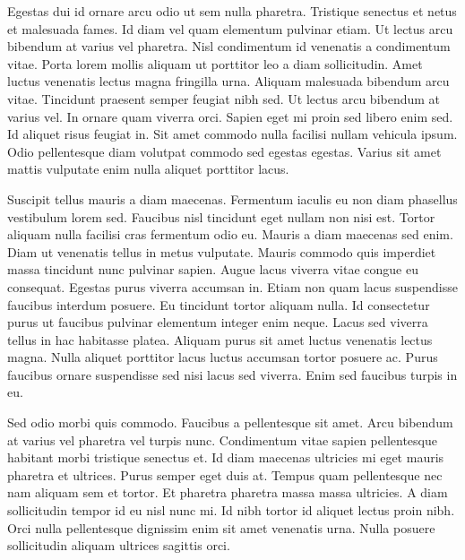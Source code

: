 \documentclass[paper = a4, fontsize = 12pt, numbers = noenddot, DIV = 15, twoside, 
paper = portrait,
listof = totoc,
listof = chapterentry,
egregdoesnotlikesansseriftitles, %
parskip = half %
]{scrbook}
\begin{document}
Egestas dui id ornare arcu odio ut sem nulla pharetra. Tristique senectus et netus et malesuada fames. Id diam vel quam elementum pulvinar etiam. Ut lectus arcu bibendum at varius vel pharetra. Nisl condimentum id venenatis a condimentum vitae. Porta lorem mollis aliquam ut porttitor leo a diam sollicitudin. Amet luctus venenatis lectus magna fringilla urna. Aliquam malesuada bibendum arcu vitae. Tincidunt praesent semper feugiat nibh sed. Ut lectus arcu bibendum at varius vel. In ornare quam viverra orci. Sapien eget mi proin sed libero enim sed. Id aliquet risus feugiat in. Sit amet commodo nulla facilisi nullam vehicula ipsum. Odio pellentesque diam volutpat commodo sed egestas egestas. Varius sit amet mattis vulputate enim nulla aliquet porttitor lacus.

Suscipit tellus mauris a diam maecenas. Fermentum iaculis eu non diam phasellus vestibulum lorem sed. Faucibus nisl tincidunt eget nullam non nisi est. Tortor aliquam nulla facilisi cras fermentum odio eu. Mauris a diam maecenas sed enim. Diam ut venenatis tellus in metus vulputate. Mauris commodo quis imperdiet massa tincidunt nunc pulvinar sapien. Augue lacus viverra vitae congue eu consequat. Egestas purus viverra accumsan in. Etiam non quam lacus suspendisse faucibus interdum posuere. Eu tincidunt tortor aliquam nulla. Id consectetur purus ut faucibus pulvinar elementum integer enim neque. Lacus sed viverra tellus in hac habitasse platea. Aliquam purus sit amet luctus venenatis lectus magna. Nulla aliquet porttitor lacus luctus accumsan tortor posuere ac. Purus faucibus ornare suspendisse sed nisi lacus sed viverra. Enim sed faucibus turpis in eu.

Sed odio morbi quis commodo. Faucibus a pellentesque sit amet. Arcu bibendum at varius vel pharetra vel turpis nunc. Condimentum vitae sapien pellentesque habitant morbi tristique senectus et. Id diam maecenas ultricies mi eget mauris pharetra et ultrices. Purus semper eget duis at. Tempus quam pellentesque nec nam aliquam sem et tortor. Et pharetra pharetra massa massa ultricies. A diam sollicitudin tempor id eu nisl nunc mi. Id nibh tortor id aliquet lectus proin nibh. Orci nulla pellentesque dignissim enim sit amet venenatis urna. Nulla posuere sollicitudin aliquam ultrices sagittis orci.
\end{document}
